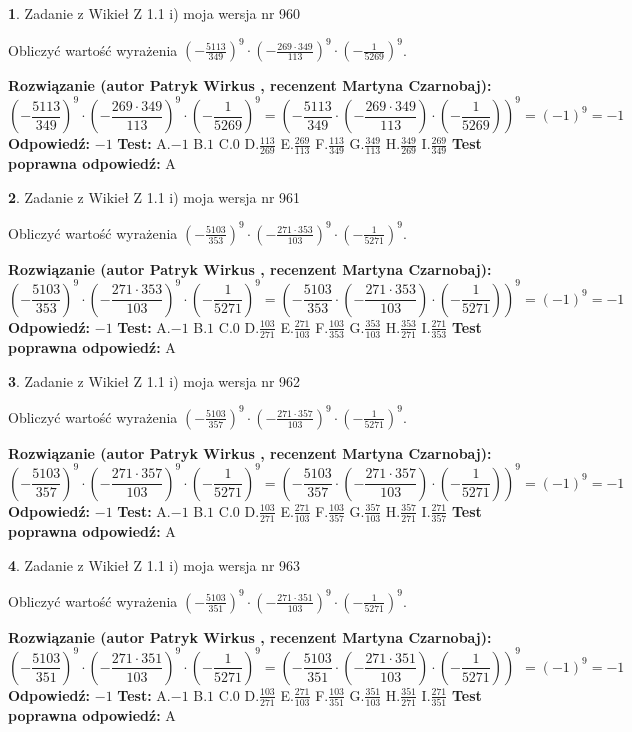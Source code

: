 \documentclass[12pt, a4paper]{article}
\theoremstyle{definition} %
\newtheorem{zad}{}
\newcommand{\zadStart}[1]{\begin{zad}#1\newline}
\newcommand{\zadStop}{\end{zad}}
\newcommand{\rozwStart}[2]{\noindent \textbf{Rozwiązanie (autor #1 , recenzent #2): }\newline}
\newcommand{\rozwStop}{\newline}
\newcommand{\odpStart}{\noindent \textbf{Odpowiedź:}\newline}
\newcommand{\odpStop}{\newline}
\newcommand{\testStart}{\noindent \textbf{Test:}\newline}
\newcommand{\testStop}{\newline}
\newcommand{\kluczStart}{\noindent \textbf{Test poprawna odpowiedź:}\newline}
\newcommand{\kluczStop}{\newline}
\begin{document}
\zadStart{Zadanie z Wikieł Z 1.1 i) moja wersja nr 960}

Obliczyć wartość wyrażenia $(-\frac{5113}{349})^{9} \cdot (-\frac{269 \cdot 349}{113})^{9} \cdot (-\frac{1}{5269})^{9}$.
\zadStop
\rozwStart{Patryk Wirkus}{Martyna Czarnobaj}
$$(-\frac{5113}{349})^{9} \cdot (-\frac{269 \cdot 349}{113})^{9} \cdot (-\frac{1}{5269})^{9} = (-\frac{5113}{349} \cdot (-\frac{269 \cdot 349}{113}) \cdot (-\frac{1}{5269}))^{9} = (-1)^{9} = -1$$
\rozwStop
\odpStart
$-1$
\odpStop
\testStart
A.$-1$ B.$1$ C.$0$ D.$\frac{113}{269}$ E.$\frac{269}{113}$
F.$\frac{113}{349}$ G.$\frac{349}{113}$
H.$\frac{349}{269}$
I.$\frac{269}{349}$
\testStop
\kluczStart
A
\kluczStop



\zadStart{Zadanie z Wikieł Z 1.1 i) moja wersja nr 961}

Obliczyć wartość wyrażenia $(-\frac{5103}{353})^{9} \cdot (-\frac{271 \cdot 353}{103})^{9} \cdot (-\frac{1}{5271})^{9}$.
\zadStop
\rozwStart{Patryk Wirkus}{Martyna Czarnobaj}
$$(-\frac{5103}{353})^{9} \cdot (-\frac{271 \cdot 353}{103})^{9} \cdot (-\frac{1}{5271})^{9} = (-\frac{5103}{353} \cdot (-\frac{271 \cdot 353}{103}) \cdot (-\frac{1}{5271}))^{9} = (-1)^{9} = -1$$
\rozwStop
\odpStart
$-1$
\odpStop
\testStart
A.$-1$ B.$1$ C.$0$ D.$\frac{103}{271}$ E.$\frac{271}{103}$
F.$\frac{103}{353}$ G.$\frac{353}{103}$
H.$\frac{353}{271}$
I.$\frac{271}{353}$
\testStop
\kluczStart
A
\kluczStop



\zadStart{Zadanie z Wikieł Z 1.1 i) moja wersja nr 962}

Obliczyć wartość wyrażenia $(-\frac{5103}{357})^{9} \cdot (-\frac{271 \cdot 357}{103})^{9} \cdot (-\frac{1}{5271})^{9}$.
\zadStop
\rozwStart{Patryk Wirkus}{Martyna Czarnobaj}
$$(-\frac{5103}{357})^{9} \cdot (-\frac{271 \cdot 357}{103})^{9} \cdot (-\frac{1}{5271})^{9} = (-\frac{5103}{357} \cdot (-\frac{271 \cdot 357}{103}) \cdot (-\frac{1}{5271}))^{9} = (-1)^{9} = -1$$
\rozwStop
\odpStart
$-1$
\odpStop
\testStart
A.$-1$ B.$1$ C.$0$ D.$\frac{103}{271}$ E.$\frac{271}{103}$
F.$\frac{103}{357}$ G.$\frac{357}{103}$
H.$\frac{357}{271}$
I.$\frac{271}{357}$
\testStop
\kluczStart
A
\kluczStop



\zadStart{Zadanie z Wikieł Z 1.1 i) moja wersja nr 963}

Obliczyć wartość wyrażenia $(-\frac{5103}{351})^{9} \cdot (-\frac{271 \cdot 351}{103})^{9} \cdot (-\frac{1}{5271})^{9}$.
\zadStop
\rozwStart{Patryk Wirkus}{Martyna Czarnobaj}
$$(-\frac{5103}{351})^{9} \cdot (-\frac{271 \cdot 351}{103})^{9} \cdot (-\frac{1}{5271})^{9} = (-\frac{5103}{351} \cdot (-\frac{271 \cdot 351}{103}) \cdot (-\frac{1}{5271}))^{9} = (-1)^{9} = -1$$
\rozwStop
\odpStart
$-1$
\odpStop
\testStart
A.$-1$ B.$1$ C.$0$ D.$\frac{103}{271}$ E.$\frac{271}{103}$
F.$\frac{103}{351}$ G.$\frac{351}{103}$
H.$\frac{351}{271}$
I.$\frac{271}{351}$
\testStop
\kluczStart
A
\kluczStop
\end{document}
